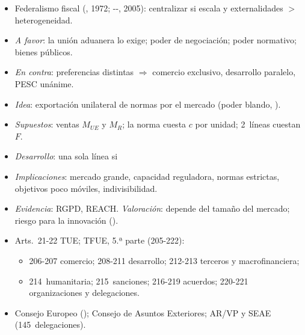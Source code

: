 \documentclass{article}
\begin{document}
\begin{columnas}
\begin{itemize}
\item Federalismo fiscal (, 1972; --, 2005): centralizar si escala y externalidades $>$ heterogeneidad.
\item \emph{A favor}: la unión aduanera lo exige; poder de negociación; poder normativo; bienes públicos.
\item \emph{En contra}: preferencias distintas $\Rightarrow$ comercio exclusivo, desarrollo paralelo, PESC unánime.
\end{itemize}
\begin{itemize}
\item \emph{Idea}: exportación unilateral de normas por el mercado (poder blando, ).
\item \emph{Supuestos}: ventas $M_{UE}$ y $M_R$; la norma cuesta $c$ por unidad; 2~líneas cuestan $F$.
\item \emph{Desarrollo}: una sola línea si
\item \emph{Implicaciones}: mercado grande, capacidad reguladora, normas estrictas, objetivos poco móviles, indivisibilidad.
\item \emph{Evidencia}: RGPD, REACH. \emph{Valoración}: depende del tamaño del mercado; riesgo para la innovación ().
\end{itemize}
\begin{itemize}
\item Arts.~21-22 TUE; TFUE, 5.ª parte (205-222):
  \begin{itemize}
  \item 206-207 comercio; 208-211 desarrollo; 212-213 terceros y macrofinanciera;
  \item 214~humanitaria; 215~sanciones; 216-219 acuerdos; 220-221 organizaciones y delegaciones.
  \end{itemize}
\end{itemize}
\begin{itemize}
\item Consejo Europeo (); Consejo de Asuntos Exteriores; AR/VP  y SEAE (145~delegaciones).

\end{itemize}
\end{columnas}
\end{document}
